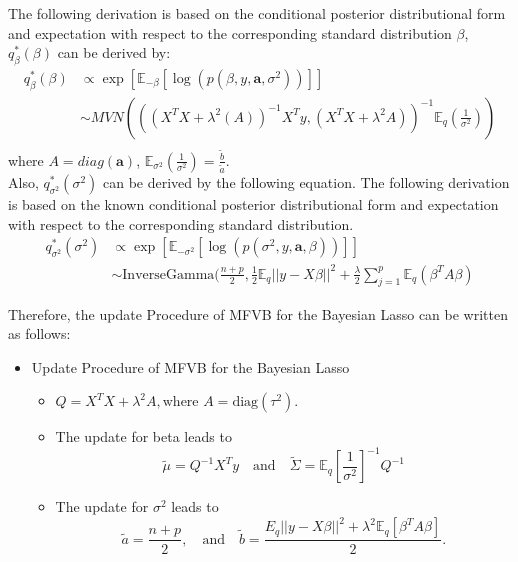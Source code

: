 The following derivation is based on the conditional posterior distributional form and expectation with respect to the corresponding standard distribution
$\beta$, $q_{\beta}^{*}(\beta)$ can be derived by:
\begin{equation}
	\begin{aligned}
		q_{\beta}^{*}(\beta) & \propto \exp[\mathbb{E}_{-\beta}[\log(p(\beta, y,\mathbf{a},\sigma^2))]]\\
		& \sim MVN(((X^TX + \lambda^2(A))^{-1}X^Ty, (X^TX+\lambda^2A))^{-1}\mathbb{E}_{q}(\frac{1}{\sigma^2}))\\
	\end{aligned}
\end{equation}
where $A = diag(\mathbf{a})$, $\mathbb{E}_{\sigma^2}(\frac{1}{\sigma^2}) = \frac{\tilde{b}}{\tilde{a}}$.\\
Also, $q_{\sigma^2}^{*}(\sigma^2)$ can be derived by the following equation.
The following derivation is based on the known conditional posterior distributional form and expectation with respect to the corresponding standard distribution.
\begin{equation}
	\begin{aligned}
		q_{\sigma^2}^{*}(\sigma^2) & \propto \exp[\mathbb{E}_{-\sigma^2}[\log(p(\sigma^2, y,\mathbf{a},\beta))]]\\
		&\sim \text{InverseGamma}(\frac{n+p}{2}, \frac{1}{2} \mathbb{E}_q||y-X\beta||^2 + \frac{\lambda}{2}\sum_{j=1}^p \mathbb{E}_q(\beta^TA\beta)
	\end{aligned}
\end{equation}
%

Therefore, the update Procedure of MFVB for the Bayesian Lasso can be written as follows:
\begin{itemize}
	\item Update Procedure of MFVB for the Bayesian Lasso
	\begin{itemize}
		\item  $Q = X^TX + \lambda^2 A ,\text{where } A = \mbox{diag}(\tau^2)$.
		
		\item The update for beta leads to 
		$$
		\widetilde{\mu} = Q^{-1}X^Ty \quad \mbox{and} \quad \widetilde{\Sigma} = \mathbb{E}_{q}\left[\frac{1}{\sigma^2}\right]^{-1} Q^{-1}$$ 
		
		\item  The update for $\sigma^2$ leads to 
		$$
		\widetilde{a} = \frac{n+p}{2}, \quad \mbox{and} \quad \widetilde{b} = \frac{E_{q}||y-X\beta||^2 + \lambda^2 \mathbb{E}_{q}[\beta^TA\beta]}{2}.
		$$
	\end{itemize}
\end{itemize}

